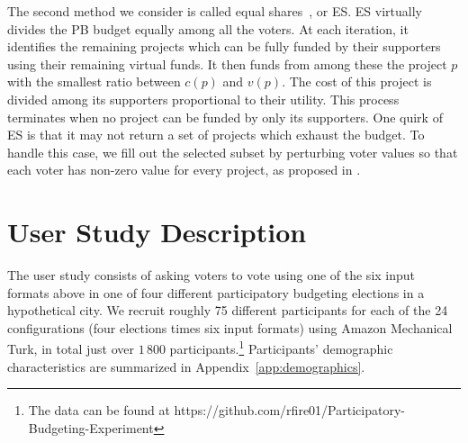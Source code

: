 \documentclass{comsoc2023}
\newcommand{\mes}{ES}
\begin{document}
The  second method we consider is called equal shares~\citep{PS20}, %
 or \mes{}. %
\mes{} virtually  divides the PB budget equally among all the voters. 
At each iteration, it identifies the remaining projects which can be fully funded by their supporters using their remaining virtual funds.
It then funds from among these the  project $p$ with the smallest ratio between $c(p)$ and $v(p)$. 
The cost of this project is divided among its supporters proportional to their utility. %
This process terminates when no project can be funded by only its supporters. %
%
One quirk of \mes{} is that it may not return a set of projects which exhaust the budget. To handle this case, we fill out the selected subset by perturbing voter values so that each voter has non-zero value for every project, as proposed in  \citet{peters2021proportional}. 


\section{User Study Description}\label{sec:description}



The user study consists of asking voters to vote using one of the six input formats above in one of four different participatory budgeting elections in a hypothetical city. 
We recruit roughly 75  different participants for each of the 24 configurations (four elections times six input formats)   using Amazon Mechanical Turk, in total  just over $1\,800$ participants.\footnote{The data can be found at https://github.com/rfire01/Participatory-Budgeting-Experiment} Participants' demographic characteristics are summarized in Appendix~\ref{app:demographics}.   
\end{document}
